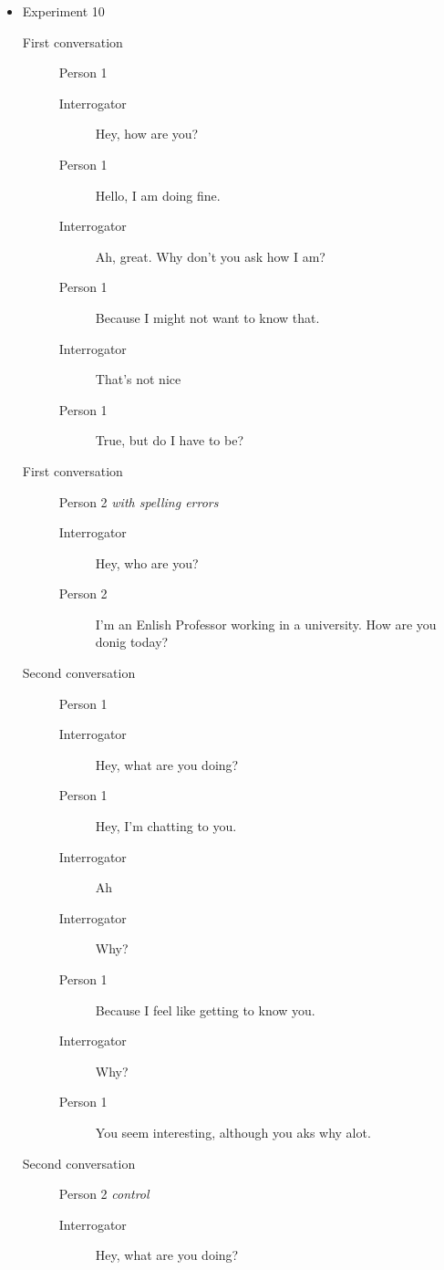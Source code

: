 \begin{itemize}
   \item Experiment 10
      \begin{description}
         \item [First conversation] Person 1
            \begin{description}
               \item [Interrogator] Hey, how are you?
               \item [Person 1] Hello, I am doing fine.
               \item [Interrogator] Ah, great. Why don't you ask how I am?
               \item [Person 1] Because I might not want to know that.
               \item [Interrogator] That's not nice
               \item [Person 1] True, but do I have to be?
            \end{description}
         \item [First conversation] Person 2 \textit{with spelling errors}
            \begin{description}
               \item [Interrogator] Hey, who are you?
               \item [Person 2] I'm an Enlish Professor working in a university. How are you donig today?
            \end{description}
         \item [Second conversation] Person 1
            \begin{description}
               \item [Interrogator] Hey, what are you doing?
               \item [Person 1] Hey, I'm chatting to you.
               \item [Interrogator] Ah
               \item [Interrogator] Why?
               \item [Person 1] Because I feel like getting to know you.
               \item [Interrogator] Why?
               \item [Person 1] You seem interesting, although you aks why alot.
            \end{description}
         \item [Second conversation] Person 2 \textit{control}
            \begin{description}
               \item [Interrogator] Hey, what are you  doing?

\end{description}
\end{description}
\end{itemize}
